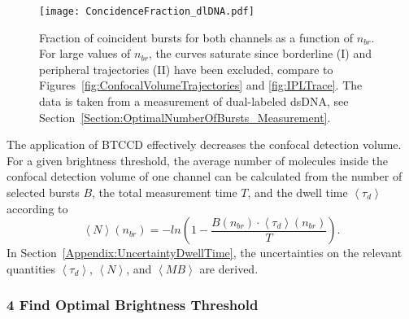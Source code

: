 \begin{figure}[h]
	\centering
	\texttt{[image: ConcidenceFraction\_dlDNA.pdf]}
	\caption[Coincidence fraction as a function of $n_{br}$]{Fraction of coincident bursts for both channels as a function of $n_{br}$. For large values of $n_{br}$, the curves saturate since borderline (I) and peripheral trajectories (II) have been excluded, compare to Figures~\ref{fig:ConfocalVolumeTrajectories} and \ref{fig:IPLTrace}. The data is taken from a measurement of dual-labeled \gls{dsDNA}, see Section~\ref{Section:OptimalNumberOfBursts_Measurement}.}
	\label{fig:CoincidenceFraction_dlDNA}
\end{figure}

The application of \gls{BTCCD} effectively decreases the confocal detection volume. For a given brightness threshold, the average number of molecules inside the confocal detection volume of one channel can be calculated from the number of selected bursts $B$, the total measurement time $T$, and the dwell time $\left\langle \tau_d \right\rangle$ according to \cite{Hoefig2020}
\begin{equation} \label{Equation:AverageNumberOfMolecules}
	\left\langle N \right\rangle (n_{br})  = -ln\left(1 - \frac{B(n_{br}) \cdot \left\langle \tau_d \right\rangle(n_{br})}{T}\right).
\end{equation}
In Section~\ref{Appendix:UncertaintyDwellTime}, the uncertainties on the relevant quantities $\left\langle \tau_d \right\rangle$, $\left\langle N \right\rangle$, and $\left\langle MB \right\rangle$ are derived.

\subsubsection*{4 Find Optimal Brightness Threshold}

